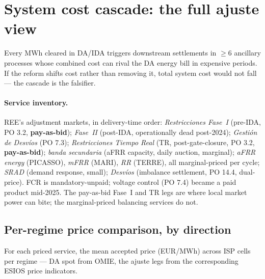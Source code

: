 \documentclass[11pt,a4paper]{article}
\begin{document}
\section{System cost cascade: the full ajuste view}\label{sec:prov:full_cascade}

\noindent Every MWh cleared in DA/IDA triggers downstream settlements in $\ge 6$ ancillary processes whose combined cost can rival the DA energy bill in expensive periods. If the reform shifts cost rather than removing it, total system cost would not fall --- the cascade is the falsifier.

\paragraph{Service inventory.} REE's adjustment markets, in delivery-time order: \emph{Restricciones Fase~I} (pre-IDA, PO 3.2, \textbf{pay-as-bid}); \emph{Fase~II} (post-IDA, operationally dead post-2024); \emph{Gestión de Desvíos} (PO 7.3); \emph{Restricciones Tiempo Real} (TR, post-gate-closure, PO 3.2, \textbf{pay-as-bid}); \emph{banda secundaria} (aFRR capacity, daily auction, marginal); \emph{aFRR energy} (PICASSO), \emph{mFRR} (MARI), \emph{RR} (TERRE), all marginal-priced per cycle; \emph{SRAD} (demand response, small); \emph{Desvíos} (imbalance settlement, PO 14.4, dual-price). FCR is mandatory-unpaid; voltage control (PO 7.4) became a paid product mid-2025. The pay-as-bid Fase~I and TR legs are where local market power can bite; the marginal-priced balancing services do not.

\subsection{Per-regime price comparison, by direction}\label{sec:prov:full_cascade:prices}

\noindent For each priced service, the mean accepted price (EUR/MWh) across ISP cells per regime --- DA spot from OMIE, the ajuste legs from the corresponding ESIOS price indicators.

\begin{table}[H]
\centering\scriptsize
\caption{\textbf{Per-regime average UP price by service, EUR/MWh.} ``---'' $=$ no data in window. Sources: ESIOS indicator IDs cited inline in the section preamble; arithmetic mean across ISP-15 cells. \emph{\color{seasoncol}Bracketed (SA) values}: Duan-smeared Fourier+DOW seasonally adjusted predictions, applied to outcomes with multi-year daily series (DA spot from OMIE; aFRR reserve from ESIOS id 634). DA spot decline strengthens post-deseasonalization (ISP15-win $132.7$ {\color{seasoncol}(SA)} $\to$ DA15/ID15 $65.3$ {\color{seasoncol}(SA)}, winter raw inflated by heating-demand seasonality). aFRR reserve same direction. Other rows kept raw.}
\label{tab:cascade_prices_up}
\setlength{\tabcolsep}{4pt}

\end{table}
\end{document}

